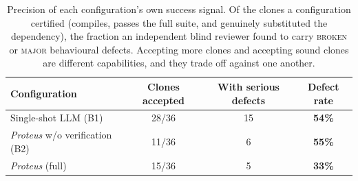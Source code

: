 \begin{table}[t]
\centering
\caption{Precision of each configuration's own success signal. Of the
clones a configuration certified (compiles, passes the full suite, and
genuinely substituted the dependency), the fraction an independent
blind reviewer found to carry \textsc{broken} or \textsc{major}
behavioural defects. Accepting more clones and accepting sound clones
are different capabilities, and they trade off against one another.}
\label{tab:precision}
\small
\begin{tabular}{lccc}
\toprule
Configuration & Clones accepted & With serious defects & Defect rate \\
\midrule
Single-shot LLM (B1) & 28/36 & 15 & \textbf{54\%} \\
\emph{Proteus} w/o verification (B2) & 11/36 & 6 & \textbf{55\%} \\
\emph{Proteus} (full) & 15/36 & 5 & \textbf{33\%} \\
\bottomrule
\end{tabular}
\end{table}
